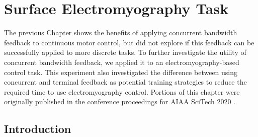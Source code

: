 \chapter{Surface Electromyography Task}
\label{chap:emg}

The previous Chapter shows the benefits of applying concurrent bandwidth feedback to continuous motor control, but did not explore if this feedback can be successfully applied to more discrete tasks.
To further investigate the utility of concurrent bandwidth feedback, we applied it to an electromyography-based control task.
This experiment also investigated the difference between using concurrent and terminal feedback as potential training strategies to reduce the required time to use electromyography control.
Portions of this chapter were originally published in the conference proceedings for AIAA SciTech 2020 \citep{doi:10.2514/6.2020-1110}.



\section{Introduction}


